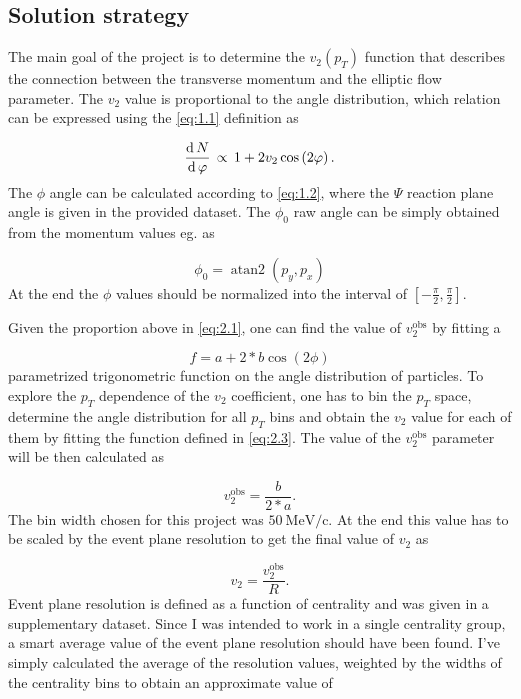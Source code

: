 \subsection{Solution strategy} \label{subsec:2.2}
The main goal of the project is to determine the $v_{2} \left( p_{T} \right)$ function that describes the connection between the transverse momentum and the elliptic flow parameter. The $v_{2}$ value is proportional to the angle distribution, which relation can be expressed using the \eqref{eq:1.1} definition as

\begin{equation} \label{eq:2.1}
	\frac{\operatorname{d}{N}}{\operatorname{d}{\varphi}}
	\,\propto\,
	1 + 2 v_{2} \cos \left( 2 \varphi \right).
\end{equation}
The $\phi$ angle can be calculated according to \eqref{eq:1.2}, where the $\Psi$ reaction plane angle is given in the provided dataset. The $\phi_{0}$ raw angle can be simply obtained from the momentum values eg. as

\begin{equation} \label{eq:2.2}
	\phi_{0}
	=
	\operatorname{atan2} \left( p_{y}, p_{x} \right)
\end{equation}
At the end the $\phi$ values should be normalized into the interval of $\left[ -\frac{\pi}{2}, \frac{\pi}{2} \right]$.

Given the proportion above in \eqref{eq:2.1}, one can find the value of $v_{2}^{\mathrm{obs}}$ by fitting a

\begin{equation} \label{eq:2.3}
	f
	=	
	a + 2 * b \cos \left( 2 \phi \right)
\end{equation}
parametrized trigonometric function on the angle distribution of particles. To explore the $p_{T}$ dependence of the $v_{2}$ coefficient, one has to bin the $p_{T}$ space, determine the angle distribution for all $p_{T}$ bins and obtain the $v_{2}$ value for each of them by fitting the function defined in \eqref{eq:2.3}. The value of the $v_{2}^{\mathrm{obs}}$ parameter will be then calculated as

\begin{equation}
	v_{2}^{\mathrm{obs}}
	=
	\frac{b}{2*a}.
\end{equation}
The bin width chosen for this project was $50\ \mathrm{MeV}/\mathrm{c}$. At the end this value has to be scaled by the event plane resolution to get the final value of $v_{2}$ as

\begin{equation}
	v_{2}
	=
	\frac{v_{2}^{\mathrm{obs}}}{R}.
\end{equation}
Event plane resolution is defined as a function of centrality and was given in a supplementary dataset. Since I was intended to work in a single centrality group, a smart average value of the event plane resolution should have been found. I've simply calculated the average of the resolution values, weighted by the widths of the centrality bins to obtain an approximate value of

